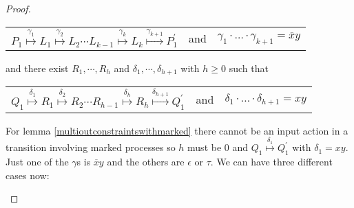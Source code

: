 \begin{proposition}
\begin{proof}
\begin{description}
	\begin{center}
	  \begin{tabular}{lll}
	    $P_{1} \stackrel{\gamma_{1}}{\longmapsto} L_{1}  \stackrel{\gamma_{2}}{\longmapsto} L_{2} \cdots L_{k-1} \stackrel{\gamma_{k}}{\longmapsto} L_{k} \stackrel{\gamma_{k+1}}{\longmapsto} P_{1}^{'}$ 
	  &
	    and
	  &
	    $\gamma_{1} \cdot \ldots \cdot \gamma_{k+1} = \overline{x}y$
	  \end{tabular}
	\end{center}
	and there exist $R_{1}, \cdots, R_{h}$ and $\delta_{1}, \cdots, \delta_{h+1}$ with $h\geq 0$ such that 
	\begin{center}
	  \begin{tabular}{lll}
	    $Q_{1} \stackrel{\delta_{1}}{\longmapsto} R_{1}  \stackrel{\delta_{2}}{\longmapsto} R_{2} \cdots R_{h-1} \stackrel{\delta_{h}}{\longmapsto} R_{h} \stackrel{\delta_{h+1}}{\longmapsto} Q_{1}^{'}$ 
	  &
	    and
	  &
	    $\delta_{1} \cdot \ldots \cdot \delta_{h+1} = xy$
	  \end{tabular}
	\end{center}
	For lemma \ref{multioutconstraintswithmarked} there cannot be an input action in a transition involving marked processes so $h$ must be $0$ and $Q_{1} \stackrel{\delta_{1}}{\longmapsto} Q_{1}^{'}$ with $\delta_{1}=xy$. Just one of the $\gamma$s is $\overline{x}y$ and the others are $\epsilon$ or $\tau$. We can have three different cases now: 
\end{description}
\end{proof}
\end{proposition}
